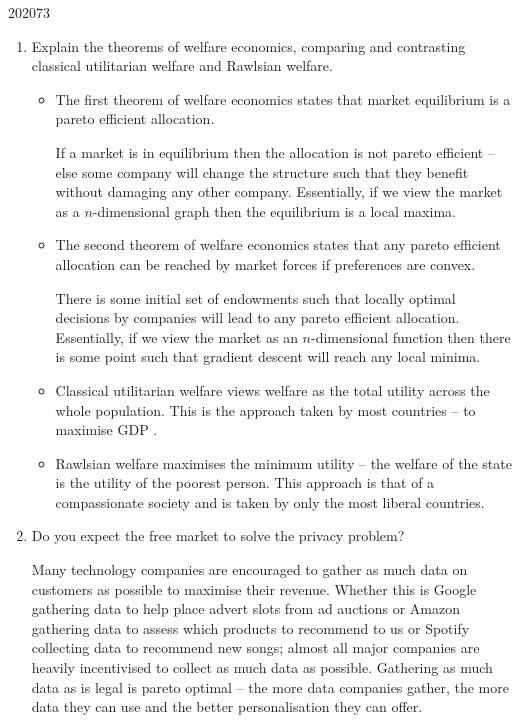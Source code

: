 \documentclass[a4paper]{article}
\begin{document}
\begin{examquestion}{2020}{7}{3}
\begin{enumerate}[label=(\alph*)]
\begin{enumerate}[label=(\roman*)]
\end{enumerate}

\item Explain the theorems of welfare economics, comparing and contrasting
classical utilitarian welfare and Rawlsian welfare.

\begin{itemize}

\item The first theorem of welfare economics states that market equilibrium
is a pareto efficient allocation.

If a market is in equilibrium then the allocation is not pareto efficient --
else some company will change the structure such that they benefit without
damaging any other company. Essentially, if we view the market as a
$n$-dimensional graph then the equilibrium is a local maxima.

\item The second theorem of welfare economics states that any pareto efficient
allocation can be reached by market forces if preferences are convex.

There is some initial set of endowments such that locally optimal decisions
by companies will lead to any pareto efficient allocation. Essentially, if
we view the market as an $n$-dimensional function then there is some point
such that gradient descent will reach any local minima.

\item Classical utilitarian welfare views welfare as the total utility across
the whole population. This is the approach taken by most countries -- to
maximise GDP .

\item Rawlsian welfare maximises the minimum utility -- the welfare of the
state is the utility of the poorest person. This approach is that of a
compassionate society and is taken by only the most liberal countries.

\end{itemize}

\item Do you expect the free market to solve the privacy problem?

Many technology companies are encouraged to gather as much data on customers
as possible to maximise their revenue. Whether this is Google gathering data
to help place advert slots from ad auctions or Amazon gathering data to
assess which products to recommend to us or Spotify collecting data to
recommend new songs; almost all major companies are heavily incentivised to
collect as much data as possible. Gathering as much data as is legal is
pareto optimal -- the more data companies gather, the more data they can use
and the better personalisation they can offer.


\end{enumerate}
\end{examquestion}
\end{document}
